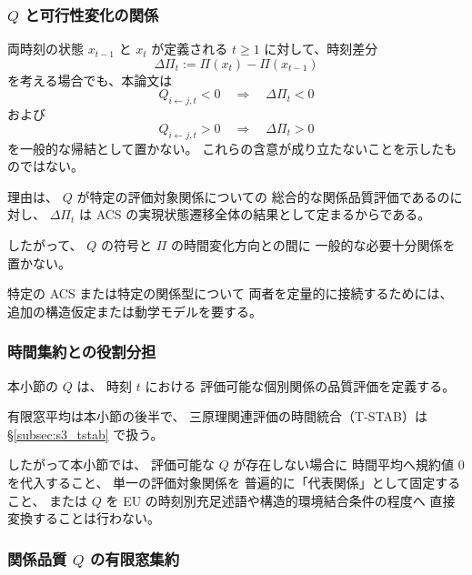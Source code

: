 \subsubsection{$Q$ と可行性変化の関係}

\begin{remark}
\label{rem:Q_connection}
両時刻の状態 $x_{t-1}$ と $x_t$ が定義される $t\ge1$ に対して、時刻差分
\[
  \Delta\Pi_t
  :=
  \Pi(x_t)-\Pi(x_{t-1})
\]
を考える場合でも、本論文は
\[
  Q_{i\leftarrow j,t}<0
  \quad\Longrightarrow\quad
  \Delta\Pi_t<0
\]
および
\[
  Q_{i\leftarrow j,t}>0
  \quad\Longrightarrow\quad
  \Delta\Pi_t>0
\]
を一般的な帰結として置かない。
これらの含意が成り立たないことを示したものではない。

理由は、
$Q$ が特定の評価対象関係についての
総合的な関係品質評価であるのに対し、
$\Delta\Pi_t$ は
ACS の実現状態遷移全体の結果として定まるからである。

したがって、
$Q$ の符号と
$\Pi$ の時間変化方向との間に
一般的な必要十分関係を置かない。

特定の ACS または特定の関係型について
両者を定量的に接続するためには、
追加の構造仮定または動学モデルを要する。
\end{remark}

\subsubsection{時間集約との役割分担}

\begin{remark}[$Q$ の時間集約は後続小節で扱う]
\label{rem:Q_temporal_deferred}
本小節の $Q$ は、
時刻 $t$ における
評価可能な個別関係の品質評価を定義する。

有限窓平均は本小節の後半で、
三原理関連評価の時間統合（T-STAB）は
\S\ref{subsec:s3_tstab} で扱う。

したがって本小節では、
評価可能な $Q$ が存在しない場合に
時間平均へ規約値 $0$ を代入すること、
単一の評価対象関係を
普遍的に「代表関係」として固定すること、
または $Q$ を EU の時刻別充足述語や構造的環境結合条件の程度へ
直接変換することは行わない。
\end{remark}



\subsubsection{関係品質 $Q$ の有限窓集約}

